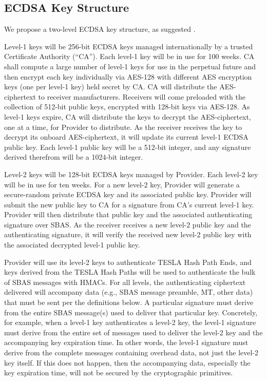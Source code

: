 \documentclass[letterpaper,times]{IONconf/IONconf}
\begin{document}
\subsection{ECDSA Key Structure} \label{sec: ECDSA Key Structure}

We propose a two-level ECDSA key structure, as suggested \cite{Neish_Dissertation}.

Level-1 keys will be 256-bit ECDSA keys managed internationally by a trusted Certificate Authority (``CA'').
Each level-1 key will be in use for 100 weeks.
CA shall compute a large number of level-1 keys for use in the perpetual future and then encrypt each key individually via AES-128 with different AES encryption keys (one per level-1 key) held secret by CA.
CA will distribute the AES-ciphertext to receiver manufacturers.
Receivers will come preloaded with the collection of 512-bit public keys, encrypted with 128-bit keys via AES-128.
As level-1 keys expire, CA will distribute the keys to decrypt the AES-ciphertext, one at a time, for Provider to distribute.
As the receiver receives the key to decrypt its onboard AES-ciphertext, it will update its current level-1 ECDSA public key.
Each level-1 public key will be a 512-bit integer, and any signature derived therefrom will be a 1024-bit integer.

Level-2 keys will be 128-bit ECDSA keys managed by Provider.
Each level-2 key will be in use for ten weeks.
For a new level-2 key, Provider will generate a secure-random private ECDSA key and its associated public key.
Provider will submit the new public key to CA for a signature from CA's current level-1 key.
Provider will then distribute that public key and the associated authenticating signature over SBAS.
As the receiver receives a new level-2 public key and the authenticating signature, it will verify the received new level-2 public key with the associated decrypted level-1 public key.

Provider will use its level-2 keys to authenticate TESLA Hash Path Ends, and keys derived from the TESLA Hash Paths will be used to authenticate the bulk of SBAS messages with HMACs.
For all levels, the authenticating ciphertext delivered will accompany data (e.g., SBAS message preamble, MT, other data) that must be sent per the definitions below.
A particular signature must derive from the entire SBAS message(s) used to deliver that particular key.
Concretely, for example, when a level-1 key authenticates a level-2 key, the level-1 signature must derive from the entire set of messages used to deliver the level-2 key and the accompanying key expiration time. 
In other words, the level-1 signature must derive from the complete messages containing overhead data, not just the level-2 key itself.
If this does not happen, then the accompanying data, especially the key expiration time, will not be secured by the cryptographic primitives.
\end{document}

